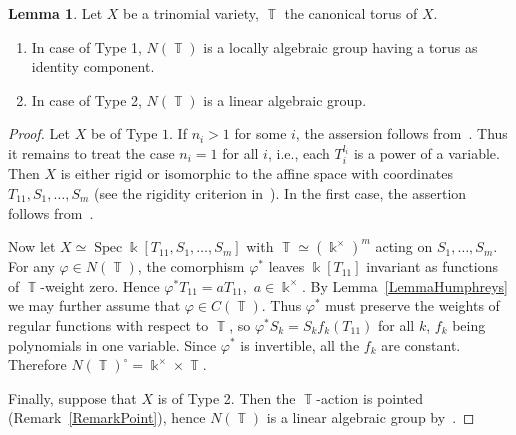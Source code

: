 \documentclass[a4paper,reqno,12pt]{amsart}
\theoremstyle{theorem}
\theoremstyle{definition}
\theoremstyle{theorem}
\newtheorem{lemma}[theorem]{Lemma}
\theoremstyle{remark}
\DeclareMathOperator{\Spec}{Spec}
\DeclareMathOperator{\TT}{\mathbb T}
\newcommand{\kk}{\Bbbk}
\newcommand{\0}{\circ}
\begin{document}
\begin{lemma}\label{Trinomial-N-Lemma}
    Let $X$ be a trinomial variety, $\TT$ the canonical torus of $X$.
    \begin{enumerate}
        \item[\emph{(i)}] In case of Type 1, $N(\TT)$ is a locally algebraic group having a torus as identity component.
        \item[\emph{(ii)}] In case of Type 2, $N(\TT)$ is a linear algebraic group.
    \end{enumerate} 
\end{lemma}
\begin{proof}
    Let $X$ be of Type $1$. %
    If $n_i>1$ for some $i$, the assersion follows from~\cite[Lemma~6.2 and Corollary~3.8]{BorG}. %
    Thus it remains to treat the case $n_i=1$ for all $i$, i.e., each $T_{i}^{l_i}$ is a power of a variable. Then $X$ is either rigid or isomorphic to the affine space with coordinates $T_{11}, S_1,\ldots, S_m$ (see the rigidity criterion in~\cite{EGS}). In the first case, the assertion follows from~\cite[Proposition~6.3]{BorG}. 
    
    Now let $X\simeq \Spec \kk[T_{11}, S_1,\ldots, S_m]$ with $\TT\simeq (\kk^\times)^m$ acting on $S_1,\ldots, S_m$.  For any $\varphi\in N(\TT)$, the comorphism $\varphi^*$ leaves $\kk[T_{11}]$ invariant as functions of $\TT$-weight zero. Hence $\varphi^*T_{11}=aT_{11},$ $a\in\kk^\times$. By Lemma~\ref{LemmaHumphreys} we may further assume that $\varphi\in C(\TT)$. Thus $\varphi^*$ must preserve the weights of regular functions with respect to $\TT$, so $\varphi^*S_k=S_kf_k(T_{11})$ for all $k$, $f_k$ being polynomials in one variable. Since $\varphi^*$ is invertible, all the $f_k$ are constant. Therefore $N(\TT)^\circ= \kk^\times\times\TT$. 

    Finally, suppose that $X$ is of Type 2. Then the $\TT$-action is pointed (Remark~\ref{RemarkPoint}), hence $N(\TT)$ is a linear algebraic group by~\cite[Proposition~2.2]{AHHL}. 
\end{proof}
\end{document}
